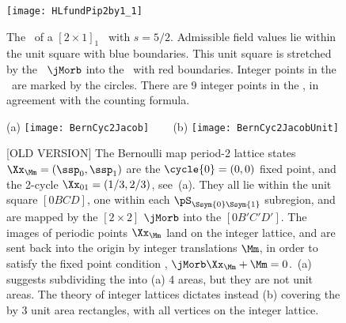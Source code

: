 \begin{description}
\begin{figure}
  \centering
\texttt{[image: HLfundPip2by1\_1]}
  \caption{\label{fig:HLfundPip2by1_1}
The \fundPip\ of a $[2\!\times\!1]_1$ \twot\ with $s=5/2$. Admissible field values lie within the unit square with blue boundaries. This unit square is stretched by the \jacobianOrb\ $\jMorb$ into the \fundPip\ with red boundaries. Integer points in the \fundPip\ are marked by the circles. There are 9 integer points in the \fundPip, in agreement with the counting formula.
            }
\end{figure}


\begin{figure}
  \centering
{(a)}
\texttt{[image: BernCyc2Jacob]}
~~~
{(b)} %
\texttt{[image: BernCyc2JacobUnit]}
  \caption{\label{fig:BernCyc2JacobOld}
[OLD VERSION] The Bernoulli map  period-2 lattice states
$\Xx_\Mm=(\ssp_0,\ssp_1)$ are the $\cycle{0}=(0,0)$ fixed
point, and the 2-cycle $\Xx_{01}=({1}/{3},{2}/{3})$, see
\,(a). They all lie within the unit square $[0BCD]$,
one within each $\pS_{\Ssym{0}\Ssym{1}}$ subregion, and are mapped by the
$[2\!\times\!2]$ {\jacobianOrb} $\jMorb$  into the
{\fundPip} $[0B'C'D']$. The images
of periodic points $\Xx_\Mm$ land on the integer lattice, and are sent back
into the origin by integer translations $\Mm$, in order to satisfy the
fixed point condition , $\jMorb\Xx_\Mm+\Mm=0$.
\,(a) suggests subdividing the {\fundPip}
into (a) 4 areas, but they are not unit areas. The theory of integer lattices
dictates instead (b) covering the {\fundPip} by 3 unit area
rectangles, with
all vertices on the integer lattice.
          }
\end{figure}
%



\end{description}
